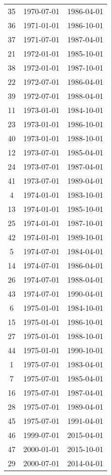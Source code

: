 % 
\begin{tabular}{ccc}
  \hline
  \hline
35 & 1970-07-01 & 1986-04-01 \\ 
  36 & 1971-01-01 & 1986-10-01 \\ 
  37 & 1971-07-01 & 1987-04-01 \\ 
  21 & 1972-01-01 & 1985-10-01 \\ 
  38 & 1972-01-01 & 1987-10-01 \\ 
  22 & 1972-07-01 & 1986-04-01 \\ 
  39 & 1972-07-01 & 1988-04-01 \\ 
  11 & 1973-01-01 & 1984-10-01 \\ 
  23 & 1973-01-01 & 1986-10-01 \\ 
  40 & 1973-01-01 & 1988-10-01 \\ 
  12 & 1973-07-01 & 1985-04-01 \\ 
  24 & 1973-07-01 & 1987-04-01 \\ 
  41 & 1973-07-01 & 1989-04-01 \\ 
  4 & 1974-01-01 & 1983-10-01 \\ 
  13 & 1974-01-01 & 1985-10-01 \\ 
  25 & 1974-01-01 & 1987-10-01 \\ 
  42 & 1974-01-01 & 1989-10-01 \\ 
  5 & 1974-07-01 & 1984-04-01 \\ 
  14 & 1974-07-01 & 1986-04-01 \\ 
  26 & 1974-07-01 & 1988-04-01 \\ 
  43 & 1974-07-01 & 1990-04-01 \\ 
  6 & 1975-01-01 & 1984-10-01 \\ 
  15 & 1975-01-01 & 1986-10-01 \\ 
  27 & 1975-01-01 & 1988-10-01 \\ 
  44 & 1975-01-01 & 1990-10-01 \\ 
  1 & 1975-07-01 & 1983-04-01 \\ 
  7 & 1975-07-01 & 1985-04-01 \\ 
  16 & 1975-07-01 & 1987-04-01 \\ 
  28 & 1975-07-01 & 1989-04-01 \\ 
  45 & 1975-07-01 & 1991-04-01 \\ 
  46 & 1999-07-01 & 2015-04-01 \\ 
  47 & 2000-01-01 & 2015-10-01 \\ 
  29 & 2000-07-01 & 2014-04-01 \\ 

\end{tabular}
